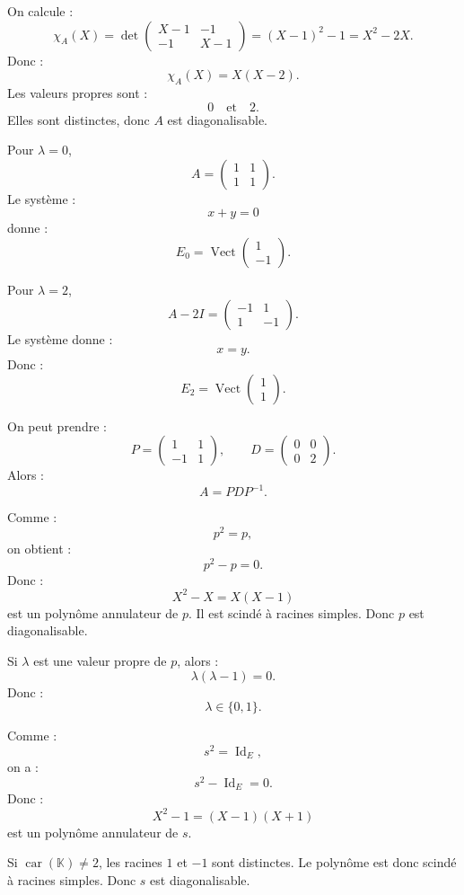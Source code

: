 \documentclass[11pt,a4paper]{article}
\newcommand{\K}{\mathbb K}
\newcommand{\Vect}{\operatorname{Vect}}
\newcommand{\Id}{\operatorname{Id}}
\begin{document}
\begin{correctionbox}[6]
On calcule :
\[
\chi_A(X)=\det
\begin{pmatrix}
X-1&-1\\
-1&X-1
\end{pmatrix}
=(X-1)^2-1=X^2-2X.
\]
Donc :
\[
\chi_A(X)=X(X-2).
\]
Les valeurs propres sont :
\[
0\quad\text{et}\quad2.
\]
Elles sont distinctes, donc \(A\) est diagonalisable.

Pour \(\lambda=0\),
\[
A=
\begin{pmatrix}
1&1\\
1&1
\end{pmatrix}.
\]
Le système :
\[
x+y=0
\]
donne :
\[
E_0=\Vect
\begin{pmatrix}
1\\-1
\end{pmatrix}.
\]

Pour \(\lambda=2\),
\[
A-2I=
\begin{pmatrix}
-1&1\\
1&-1
\end{pmatrix}.
\]
Le système donne :
\[
x=y.
\]
Donc :
\[
E_2=\Vect
\begin{pmatrix}
1\\1
\end{pmatrix}.
\]

On peut prendre :
\[
P=
\begin{pmatrix}
1&1\\
-1&1
\end{pmatrix},
\qquad
D=
\begin{pmatrix}
0&0\\
0&2
\end{pmatrix}.
\]
Alors :
\[
A=PDP^{-1}.
\]
\end{correctionbox}

\begin{correctionbox}[7]
Comme :
\[
p^2=p,
\]
on obtient :
\[
p^2-p=0.
\]
Donc :
\[
X^2-X=X(X-1)
\]
est un polynôme annulateur de \(p\).  
Il est scindé à racines simples.  
Donc \(p\) est diagonalisable.

Si \(\lambda\) est une valeur propre de \(p\), alors :
\[
\lambda(\lambda-1)=0.
\]
Donc :
\[
\lambda\in\{0,1\}.
\]
\end{correctionbox}

\begin{correctionbox}[8]
Comme :
\[
s^2=\Id_E,
\]
on a :
\[
s^2-\Id_E=0.
\]
Donc :
\[
X^2-1=(X-1)(X+1)
\]
est un polynôme annulateur de \(s\).

Si \(\operatorname{car}(\K)\neq2\), les racines \(1\) et \(-1\) sont distinctes.  
Le polynôme est donc scindé à racines simples.  
Donc \(s\) est diagonalisable.
\end{correctionbox}
\end{document}
